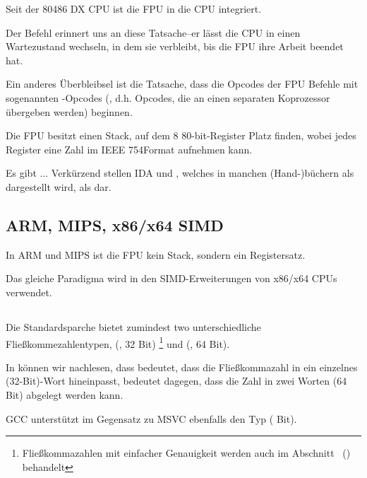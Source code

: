 Seit der 80486 DX CPU ist die \ac{FPU} in die \ac{CPU} integriert.

Der Befehl  erinnert uns an diese Tatsache--er lässt die \ac{CPU} in
einen Wartezustand wechseln, in dem sie verbleibt, bis die \ac{FPU} ihre Arbeit
beendet hat.

Ein anderes Überbleibsel ist die Tatsache, dass die Opcodes der \ac{FPU} Befehle
mit sogenannten -Opcodes (, d.h. Opcodes, die an einen
separaten Koprozessor übergeben werden) beginnen.

\label{FPU_is_stack}
Die FPU besitzt einen Stack, auf dem 8 80-bit-Register Platz finden, wobei jedes
Register eine Zahl im IEEE 754\FNURLIEEE Format aufnehmen kann.

Es gibt ... Verkürzend stellen IDA und \olly {}, welches in
manchen (Hand-)büchern als  dargestellt wird, als  dar.

\subsection{ARM, MIPS, x86/x64 SIMD}
In ARM und MIPS ist die FPU kein Stack, sondern ein Registersatz.

Das gleiche Paradigma wird in den SIMD-Erweiterungen von x86/x64 CPUs verwendet.

\subsection{\CCpp}

Die Standardsparche \CCpp bietet zumindest two unterschiedliche
Fließkommezahlentypen, \Tfloat (\FNURLSP, 32 Bit)
\footnote{Fließkommazahlen mit einfacher Genauigkeit werden auch im Abschnitt
\IT{\WorkingWithFloatAsWithStructSubSubSectionName}~()
behandelt} und \Tdouble (\FNURLDP, 64 Bit).

In  können wir nachlesen, dass  bedeutet, dass die Fließkommazahl in ein einzelnes (32-Bit)-Wort
hineinpasst,  bedeutet dagegen, dass die Zahl in zwei
Worten (64 Bit) abgelegt werden kann.

GCC unterstützt im Gegensatz zu MSVC ebenfalls den  Typ
( Bit).


